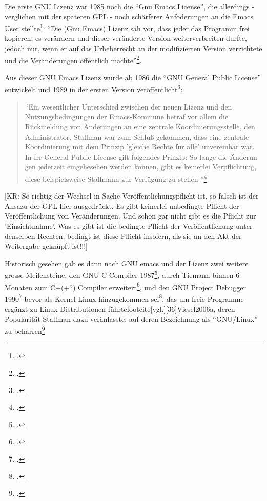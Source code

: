 \documentclass[DIV=calc,BCOR=5mm,11pt,headings=small,oneside,abstract=true, toc=bib]{scrartcl}
\begin{document}
Die erste GNU Lizenz war 1985 noch die \enquote{Gnu Emacs License}, die
allerdings - verglichen mit der späteren GPL - noch schärferer Anfoderungen an
die Emacs User stellte\footcite[vgl.][33]{Viesel2006a}: \enquote{Die (Gnu Emacs)
Lizenz sah vor, dass jeder das Programm frei kopieren, es verändern und dieser
veränderte Version weiterverbreiten durfte, jedoch nur, wenn er auf das
Urheberrecht an der modifizierten Version verzichtete und die Veränderungen
öffentlich machte}\footcite[][33]{Viesel2006a}.

Aus dieser GNU Emacs Lizenz wurde ab 1986 die \enquote{GNU General Public
License} entwickelt und 1989 in der ersten Version
veröffentlicht\footcite[vgl.][34]{Viesel2006a}:

\begin{quote}
\enquote{Ein wesentlicher Unterschied zwischen der neuen Lizenz und den
Nutzungsbedingungen der Emacs-Kommune betraf vor allem die Rückmeldung von
Änderungen an eine zentrale Koordinierungsstelle, den Administrator. Stallman
war zum Schluß gekommen, dass eine zentrale Koordinierung mit dem Prinzip
'gleiche Rechte für alle' unvereinbar war. In frr General Public License gilt
folgendes Prinzip: So lange die Änderun gen jederzeit eingehesehen werden
können, gibt es keinerlei Verpflichtung, diese beispielsweise Stallmann zur
Verfügung zu stellen
}\footcite[][34]{Viesel2006a}
\end{quote}

[KR: So richtig der Wechsel in Sache Veröffentlichungspflicht ist, so falsch
ist der Ansazu der GPL hier ausgedrückt. Es gibt keinerlei unbedingte Pflicht
der Veröffentlichung von Veränderungen. Und schon gar nicht gibt es die Pflicht
zur 'Einsichtnahme'. Was es gibt ist die bedingte Pflicht der Veröffentlichung
unter denselben Rechten: bedingt ist diese Pflicht insofern, als sie an den Akt
der Weitergabe geknüpft ist!!!]

Historisch gesehen gab es dann nach GNU emacs und der Lizenz zwei weitere grosse
Meilensteine, den GNU C Compiler 1987\footcite[vgl.][34]{Viesel2006a}, durch
Tiemann binnen 6 Monaten zum C+(+?) Compiler
erweitert\footcite[vgl.][34 VBiesel schreibt nur vom C+-Compiler,
ist das richtig?]{Viesel2006a}, und den GNU Project Debugger
1990\footcite[vgl.][35]{Viesel2006a} bevor als Kernel Linux hinzugekommen
sei\footcite[vgl.][35]{Viesel2006a}, das um freie Programme ergänzt zu
Linux-Distributionen führtefootcite[vgl.][36]{Viesel2006a}, deren Popularität
Stallman dazu veränlasste, auf deren Bezeichnung als \enquote{GNU/Linux} zu
beharren\footcite[vgl.][37]{Viesel2006a}
\end{document}
